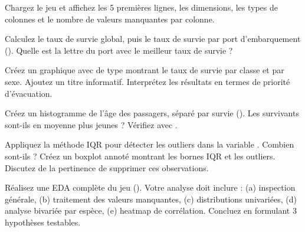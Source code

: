 \begin{exercice}[$\star$]
Chargez le jeu  et affichez les 5 premi\`eres lignes, les dimensions, les types de colonnes et le nombre de valeurs manquantes par colonne.
\end{exercice}

\begin{exercice}[$\star$]
Calculez le taux de survie global, puis le taux de survie par port d'embarquement (). Quelle est la lettre du port avec le meilleur taux de survie ?
\end{exercice}

\begin{exercice}[$\star\star$]
Cr\'eez un graphique avec  de type  montrant le taux de survie par classe et par sexe. Ajoutez un titre informatif. Interpr\'etez les r\'esultats en termes de priorit\'e d'\'evacuation.
\end{exercice}

\begin{exercice}[$\star\star$]
Cr\'eez un histogramme de l'\^age des passagers, s\'epar\'e par survie (). Les survivants sont-ils en moyenne plus jeunes ? V\'erifiez avec .
\end{exercice}

\begin{exercice}[$\star\star\star$]
Appliquez la m\'ethode IQR pour d\'etecter les outliers dans la variable . Combien sont-ils ? Cr\'eez un boxplot annot\'e montrant les bornes IQR et les outliers. Discutez de la pertinence de supprimer ces observations.
\end{exercice}

\begin{exercice}[$\star\star\star$]
R\'ealisez une EDA compl\`ete du jeu  (). Votre analyse doit inclure : (a) inspection g\'en\'erale, (b) traitement des valeurs manquantes, (c) distributions univari\'ees, (d) analyse bivari\'ee par esp\`ece, (e) heatmap de corr\'elation. Concluez en formulant 3 hypoth\`eses testables.
\end{exercice}

